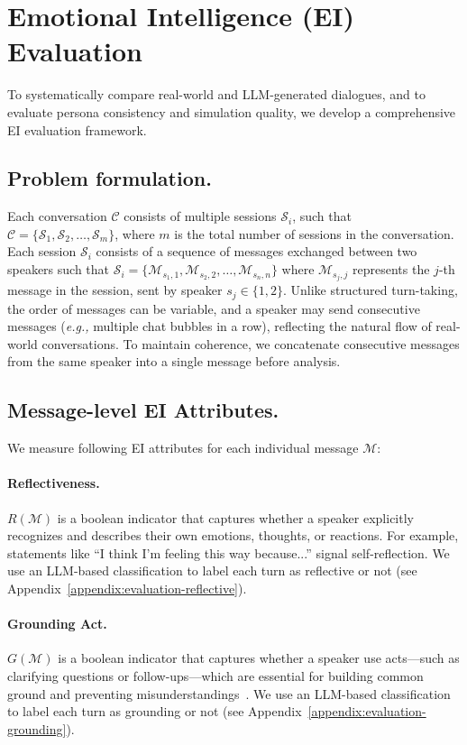 \section{Emotional Intelligence (EI) Evaluation}
\label{sec:ei-evaluation}
To systematically compare real-world and LLM-generated dialogues, and to evaluate persona consistency and simulation quality, we develop a comprehensive EI evaluation framework.

\subsection{Problem formulation.}
Each conversation $\mathcal{C}$ consists of multiple sessions $\mathcal{S}_i$, such that $\mathcal{C} = \{\mathcal{S}_1, \mathcal{S}_2, \dots, \mathcal{S}_m\}$, where $m$ is the total number of sessions in the conversation.
Each session $\mathcal{S}_i$ consists of a sequence of messages exchanged between two speakers such that $\mathcal{S}_i = \{\mathcal{M}_{s_1,1}, \mathcal{M}_{s_2,2}, \dots, \mathcal{M}_{s_n,n}\}$ where \( \mathcal{M}_{s_j,j} \) represents the \( j \)-th message in the session, sent by speaker \( s_j \in \{1,2\} \).
Unlike structured turn-taking, the order of messages can be variable, and a speaker may send consecutive messages (\textit{e.g.,} multiple chat bubbles in a row), reflecting the natural flow of real-world conversations.
To maintain coherence, we concatenate consecutive messages from the same speaker into a single message before analysis.



\subsection{Message-level EI Attributes.}
\label{ssec:message-level-ei}
We measure following EI attributes for each individual message $\mathcal{M}$:

\paragraph{Reflectiveness.} $R(\mathcal{M})$ is a boolean indicator that captures whether a speaker explicitly recognizes and describes their own emotions, thoughts, or reactions. 
For example, statements like ``I think I’m feeling this way because...'' signal self-reflection. 
We use an LLM-based classification to label each turn as reflective or not (see Appendix~\ref{appendix:evaluation-reflective}).

\paragraph{Grounding Act.}
$G(\mathcal{M})$ is a boolean indicator that captures whether a speaker use acts—such as clarifying questions or follow-ups—which are essential for building common ground and preventing misunderstandings~\cite{clark1996using, clark1989contributing, shaikh-etal-2024-grounding}.
We use an LLM-based classification to label each turn as grounding or not (see Appendix~\ref{appendix:evaluation-grounding}).

